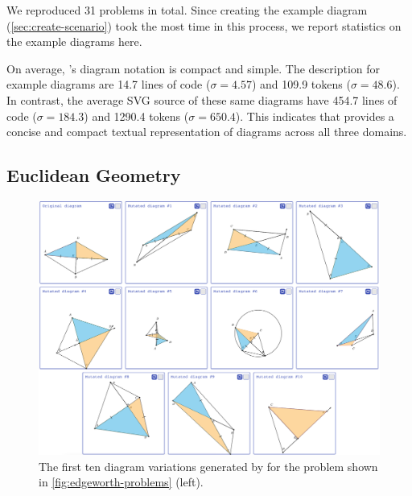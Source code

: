 We reproduced 31 problems in total. Since creating the example diagram (\cref{sec:create-scenario}) took the most time in this process, we report statistics on the example diagrams here. 

On average, \Edgeworth's diagram notation is compact and simple. The description for example diagrams are 14.7 lines of code ($\sigma = 4.57$) and 109.9 tokens ($\sigma = 48.6$). In contrast, the average SVG source of these same diagrams have 454.7 lines of code ($\sigma = 184.3$) and 1290.4 tokens ($\sigma = 650.4$). This indicates that \Edgeworth provides a concise and compact textual representation of diagrams across all three domains.

\subsection{Euclidean Geometry}
\label{sec:edgeworth-geometry}

\begin{figure}[h]
    \centering
    \includegraphics[width=\linewidth]{assets/edgeworth/geometry-grid.png}
    \caption{\textmd{The first ten diagram variations generated by \Edgeworth for the problem shown in \cref{fig:edgeworth-problems} (left).}}
    \label{fig:geometry-grid}
\end{figure}

